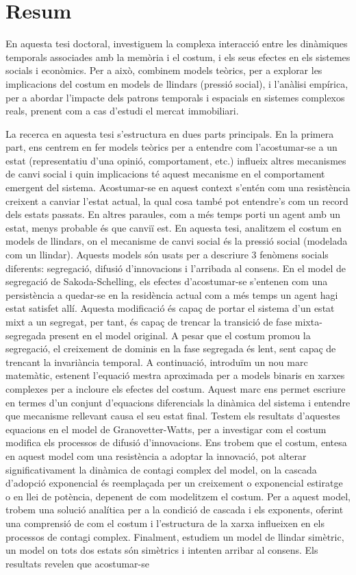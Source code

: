 \pagebreak
\thispagestyle{empty}
\section*{Resum}

En aquesta tesi doctoral, investiguem la complexa interacció entre les dinàmiques temporals associades amb la memòria i el costum, i els seus efectes en els sistemes socials i econòmics. Per a això, combinem models teòrics, per a explorar les implicacions del costum en models de llindars (pressió social), i l'anàlisi empírica, per a abordar l'impacte dels patrons temporals i espacials en sistemes complexos reals, prenent com a cas d'estudi el mercat immobiliari.

La recerca en aquesta tesi s'estructura en dues parts principals. En la primera part, ens centrem en fer models teòrics per a entendre com l'acostumar-se a un estat (representatiu d'una opinió, comportament, etc.) influeix altres mecanismes de canvi social i quin implicacions té aquest mecanisme en el comportament emergent del sistema. Acostumar-se en aquest context s'entén com una resistència creixent a canviar l'estat actual, la qual cosa també pot entendre's com un record dels estats passats. En altres paraules, com a més temps porti un agent amb un estat, menys probable és que canviï est. En aquesta tesi, analitzem el costum en models de llindars, on el mecanisme de canvi social és la pressió social (modelada com un llindar). Aquests models són usats per a descriure 3 fenòmens socials diferents: segregació, difusió d'innovacions i l'arribada al consens. En el model de segregació de Sakoda-Schelling, els efectes d'acostumar-se s'entenen com una persistència a quedar-se en la residència actual com a més temps un agent hagi estat satisfet allí. Aquesta modificació és capaç de portar el sistema d'un estat mixt a un segregat, per tant, és capaç de trencar la transició de fase mixta-segregada present en el model original. A pesar que el costum promou la segregació, el creixement de dominis en la fase segregada és lent, sent capaç de trencant la invariància temporal. A continuació, introduïm un nou marc matemàtic, estenent l'equació mestra aproximada per a models binaris en xarxes complexes per a incloure els efectes del costum. Aquest marc ens permet escriure en termes d'un conjunt d'equacions diferencials la dinàmica del sistema i entendre que mecanisme rellevant causa el seu estat final. Testem els resultats d'aquestes equacions en el model de Granovetter-Watts, per a investigar com el costum modifica els processos de difusió d'innovacions. Ens trobem que el costum, entesa en aquest model com una resistència a adoptar la innovació, pot alterar significativament la dinàmica de contagi complex del model, on la cascada d'adopció exponencial és reemplaçada per un creixement o exponencial estiratge o en llei de potència, depenent de com modelitzem el costum. Per a aquest model, trobem una solució analítica per a la condició de cascada i els exponents, oferint una comprensió de com el costum i l'estructura de la xarxa influeixen en els processos de contagi complex. Finalment, estudiem un model de llindar simètric, un model on tots dos estats són simètrics i intenten arribar al consens. Els resultats revelen que acostumar-se 